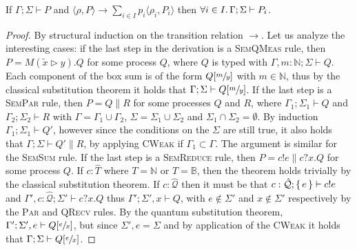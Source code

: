 \begin{theorem}
  If $\Gamma; \Sigma \vdash P$ and $\langle \rho, P \rangle \longrightarrow \sum_{i \in I} p_i \langle \rho_i, P_i \rangle$ then
  $\forall i \in I \ldotp \Gamma; \Sigma \vdash P_i$.
\end{theorem}
\begin{proof}
  By structural induction on the transition relation $\longrightarrow$.
  Let us analyze the interesting cases: if the last step in the derivation is a \textsc{SemQMeas} rule, then $P = M(\widetilde{x} \rhd y).Q$ for some process $Q$,
  where $Q$ is typed with $\Gamma, m : \mathbb{N}; \Sigma \vdash Q$. Each component of the box sum is of the form $Q[\sfrac{m}{y}]$ with $m \in \mathbb{N}$, thus
  by the classical substitution theorem it holds that $\Gamma; \Sigma \vdash Q[\sfrac{m}{y}]$.
  If the last step is a \textsc{SemPar} rule, then $P = Q \parallel R$ for some processes $Q$ and $R$, where
  $\Gamma_1; \Sigma_1 \vdash Q$ and $\Gamma_2; \Sigma_2 \vdash R$ with $\Gamma = \Gamma_1 \cup \Gamma_2$, $\Sigma = \Sigma_1 \cup \Sigma_2$ and $\Sigma_1 \cap \Sigma_2 = \emptyset$.
  By induction $\Gamma_1; \Sigma_1 \vdash Q'$, however since the conditions on the $\Sigma$ are still true, it also holds that $\Gamma; \Sigma \vdash Q' \parallel R$, by applying \textsc{CWeak} if $\Gamma_1 \subset \Gamma$.
  The argument is similar for the \textsc{SemSum} rule.
  If the last step is a \textsc{SemReduce} rule, then $P = c!e \parallel c?x.Q$ for some process $Q$. If $c : \hat{T}$ where $T = \mathbb{N}$ or $T = \mathbb{B}$, then
  the theorem holds trivially by the classical substitution theorem.
  If $c : \hat{\mathcal{Q}}$ then it must be that $c : \hat{\mathcal{Q}}; \set{e} \vdash c!e$ and $\Gamma', c : \hat{\mathcal{Q}}; \Sigma' \vdash c?x.Q$ thus $\Gamma'; \Sigma', x \vdash Q$,
  with $e \not\in \Sigma'$ and $x \not\in \Sigma'$ respectively by the \textsc{Par} and \textsc{QRecv} rules. By the quantum substitution theorem, $\Gamma'; \Sigma', e \vdash Q[\sfrac{e}{x}]$,
  but since $\Sigma', e = \Sigma$ and by application of the \textsc{CWeak} it holds that $\Gamma; \Sigma \vdash Q[\sfrac{e}{x}]$.
\end{proof}
